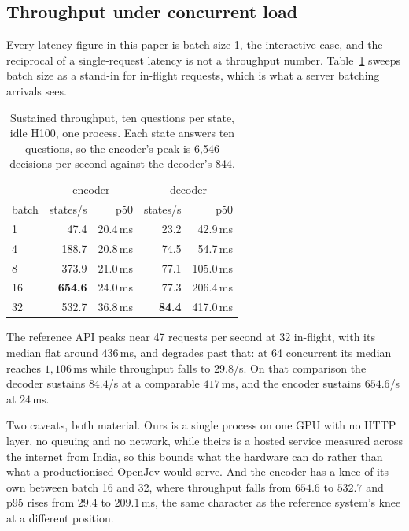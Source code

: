 \subsection{Throughput under concurrent load}
\label{sec:res-throughput}

Every latency figure in this paper is batch size 1, the interactive case,
and the reciprocal of a single-request latency is not a throughput
number. Table~\ref{tab:throughput} sweeps batch size as a stand-in for
in-flight requests, which is what a server batching arrivals sees.

\begin{table}[t]
\centering
\begin{tabular}{lrrrr}
\toprule
 & \multicolumn{2}{c}{encoder} & \multicolumn{2}{c}{decoder} \\
batch & states/s & p50 & states/s & p50 \\
\midrule
 1 &  47.4 & 20.4\,ms & 23.2 &  42.9\,ms \\
 4 & 188.7 & 20.8\,ms & 74.5 &  54.7\,ms \\
 8 & 373.9 & 21.0\,ms & 77.1 & 105.0\,ms \\
16 & \textbf{654.6} & 24.0\,ms & 77.3 & 206.4\,ms \\
32 & 532.7 & 36.8\,ms & \textbf{84.4} & 417.0\,ms \\
\bottomrule
\end{tabular}
\caption{Sustained throughput, ten questions per state, idle H100, one
process. Each state answers ten questions, so the encoder's peak is
6{,}546 decisions per second against the decoder's 844.}
\label{tab:throughput}
\end{table}

The reference API peaks near 47 requests per second at 32 in-flight, with
its median flat around $436$\,ms, and degrades past that: at 64 concurrent
its median reaches $1{,}106$\,ms while throughput falls to $29.8$/s. On
that comparison the decoder sustains $84.4$/s at a comparable $417$\,ms,
and the encoder sustains $654.6$/s at $24$\,ms.

Two caveats, both material. Ours is a single process on one GPU with no
HTTP layer, no queuing and no network, while theirs is a hosted service
measured across the internet from India, so this bounds what the hardware
can do rather than what a productionised OpenJev would serve. And the
encoder has a knee of its own between batch 16 and 32, where throughput
falls from $654.6$ to $532.7$ and p95 rises from $29.4$ to $209.1$\,ms,
the same character as the reference system's knee at a different
position.

